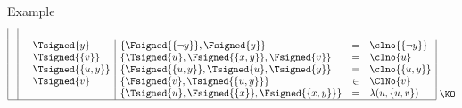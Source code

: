 \begin{frame}{Example}
\[\begin{array}[b]{|c|ll|lcl|}
      \\
                 &                           &\Tsigned{y}          &\{\Fsigned{\{\neg y\}},\Fsigned{y}\}             & = &\clno{\{\neg y\}}
      \\
                 &                           &\Tsigned{\{v\}}      &\{\Tsigned{u},\Fsigned{\{x,y\}},\Fsigned\{v\}\}  & = &\clno{u}
      \\
                 &                           &\Tsigned{\{u,y\}}    &\{\Fsigned{\{u,y\}},\Tsigned{u},\Tsigned{y}\}    & = &\clno{\{u,y\}}
      \\
                 &                           &\Tsigned{v}          &\{\Fsigned{v},\Tsigned{\{u,y\}}\}                &\in&\ClNo{v}
      \\
                 &                           &                     &\{\Tsigned{u},\Fsigned{\{x\}},\Fsigned{\{x,y\}}\}& = &\lambda(u,\{u,v\})
      \\\hline
    \end{array}
    ~\raisebox{1mm}{\KO}
  \]
\end{frame}
%
